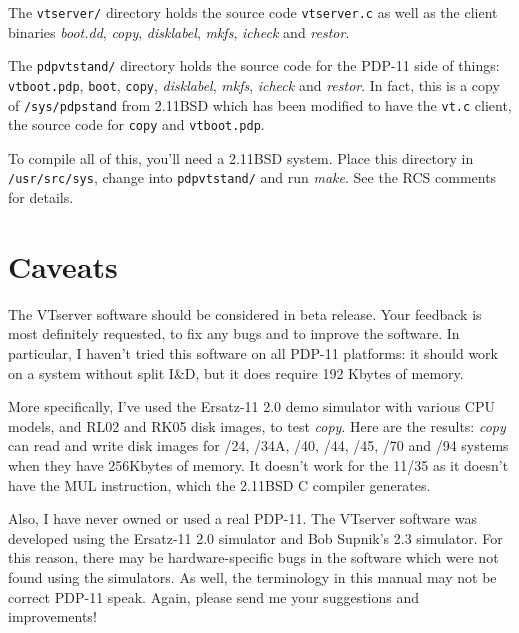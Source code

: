 The {\tt vtserver/} directory holds the source code {\tt vtserver.c} as
well as the client binaries {\it boot.dd}, {\it copy}, {\it disklabel},
{\it mkfs}, {\it icheck} and {\it restor}.

The {\tt pdpvtstand/} directory holds the source code for the PDP-11 side of
things: {\tt vtboot.pdp}, {\tt boot}, {\tt copy}, {\it disklabel},
{\it mkfs}, {\it icheck} and {\it restor}. In fact, this is a copy
of {\tt /sys/pdpstand} from 2.11BSD which has been modified to have the
{\tt vt.c} client, the source code for {\tt copy} and {\tt vtboot.pdp}.

To compile all of this, you'll need a 2.11BSD system. Place
this directory in {\tt /usr/src/sys}, change into {\tt pdpvtstand/}
and run {\it make}. See the RCS comments for details.

\section{Caveats}

The VTserver software should be considered in beta release.
Your feedback is most definitely requested, to fix any bugs and to improve
the software. In particular, I haven't tried this software on all PDP-11
platforms: it should work on a system without split I\&D, but it does
require 192 Kbytes of memory.

More specifically, I've used the Ersatz-11 2.0 demo simulator with various
CPU models, and RL02 and RK05 disk images, to test {\it copy}. Here are the
results: {\it copy} can read and write disk images for /24, /34A, /40, /44,
/45, /70 and /94 systems when they have 256Kbytes of memory. It doesn't work
for the 11/35 as it doesn't have the MUL instruction, which the 2.11BSD C
compiler generates.

Also, I have never owned or used a real PDP-11. The VTserver software was
developed using the Ersatz-11 2.0 simulator and Bob Supnik's 2.3 simulator.
For this reason, there may be hardware-specific bugs in the software which
were not found using the simulators. As well, the terminology in this manual
may not be correct PDP-11 speak. Again, please send me your suggestions and
improvements!



